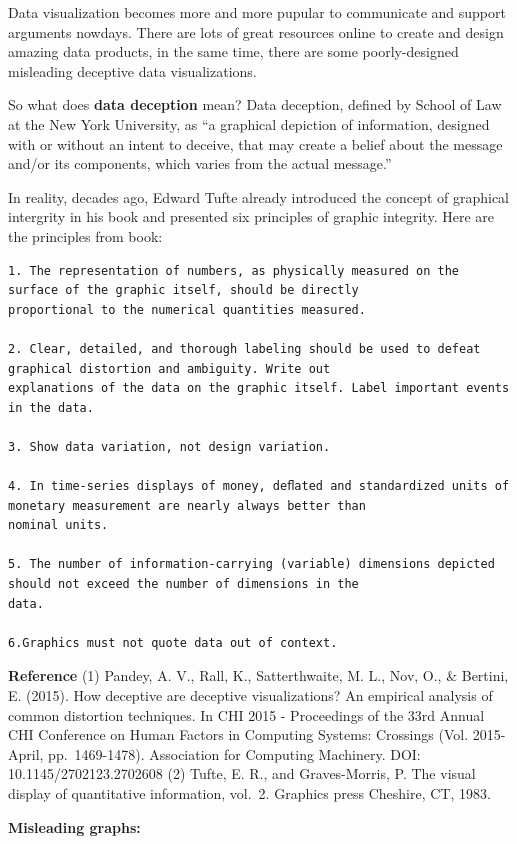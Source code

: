 \documentclass[]{book}
\theoremstyle{definition}
\theoremstyle{definition}
\theoremstyle{definition}
\theoremstyle{remark}
\begin{document}
Data visualization becomes more and more pupular to communicate and
support arguments nowdays. There are lots of great resources online to
create and design amazing data products, in the same time, there are
some poorly-designed misleading deceptive data visualizations.

So what does \textbf{data deception} mean? Data deception, defined by
School of Law at the New York University, as ``a graphical depiction of
information, designed with or without an intent to deceive, that may
create a belief about the message and/or its components, which varies
from the actual message.''

In reality, decades ago, Edward Tufte already introduced the concept of
graphical intergrity in his book and presented six principles of graphic
integrity. Here are the principles from book:

\begin{verbatim}
1. The representation of numbers, as physically measured on the surface of the graphic itself, should be directly
proportional to the numerical quantities measured.

2. Clear, detailed, and thorough labeling should be used to defeat graphical distortion and ambiguity. Write out
explanations of the data on the graphic itself. Label important events in the data.

3. Show data variation, not design variation.

4. In time-series displays of money, deﬂated and standardized units of monetary measurement are nearly always better than
nominal units.

5. The number of information-carrying (variable) dimensions depicted should not exceed the number of dimensions in the
data.

6.Graphics must not quote data out of context.
\end{verbatim}

\textbf{Reference} (1) Pandey, A. V., Rall, K., Satterthwaite, M. L.,
Nov, O., \& Bertini, E. (2015). How deceptive are deceptive
visualizations? An empirical analysis of common distortion techniques.
In CHI 2015 - Proceedings of the 33rd Annual CHI Conference on Human
Factors in Computing Systems: Crossings (Vol. 2015-April,
pp.~1469-1478). Association for Computing Machinery. DOI:
10.1145/2702123.2702608 (2) Tufte, E. R., and Graves-Morris, P. The
visual display of quantitative information, vol.~2. Graphics press
Cheshire, CT, 1983.

\textbf{Misleading graphs:}
\end{document}
